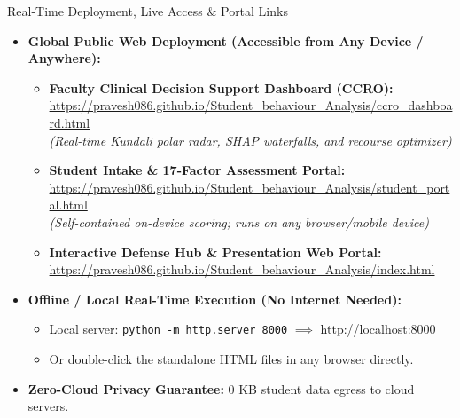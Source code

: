 \documentclass{beamer}
\begin{document}
\begin{frame}{Real-Time Deployment, Live Access \& Portal Links}
  \begin{itemize}\setlength{\itemsep}{4pt}\small
    \item \textbf{Global Public Web Deployment (Accessible from Any Device / Anywhere):}
    \begin{itemize}\setlength{\itemsep}{1.5pt}\footnotesize
      \item \textbf{Faculty Clinical Decision Support Dashboard (CCRO):} \\
      \scriptsize\url{https://pravesh086.github.io/Student_behaviour_Analysis/ccro_dashboard.html} \\
      \textit{(Real-time Kundali polar radar, SHAP waterfalls, and recourse optimizer)}
      \item \textbf{Student Intake \& 17-Factor Assessment Portal:} \\
      \scriptsize\url{https://pravesh086.github.io/Student_behaviour_Analysis/student_portal.html} \\
      \textit{(Self-contained on-device scoring; runs on any browser/mobile device)}
      \item \textbf{Interactive Defense Hub \& Presentation Web Portal:} \\
      \scriptsize\url{https://pravesh086.github.io/Student_behaviour_Analysis/index.html}
    \end{itemize}
    \item \textbf{Offline / Local Real-Time Execution (No Internet Needed):}
    \begin{itemize}\setlength{\itemsep}{1.5pt}\footnotesize
      \item Local server: \texttt{python -m http.server 8000} $\implies$ \url{http://localhost:8000}
      \item Or double-click the standalone HTML files in any browser directly.
    \end{itemize}
    \item \textbf{Zero-Cloud Privacy Guarantee:} 0 KB student data egress to cloud servers.
  \end{itemize}
\end{frame}
\end{document}
